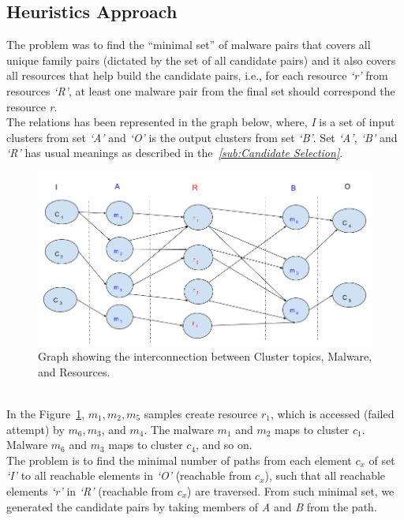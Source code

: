 \subsection{Heuristics Approach}
\label{sub:Heuristics Approach}
The problem was to find the ``minimal set'' of malware pairs that covers all unique family pairs (dictated by the set of all candidate pairs) and it also covers all resources that help build the candidate pairs, i.e., for each resource \emph{`r'} from resources \emph{`R'}, at least one malware pair from the final set should correspond the resource \emph{r}.\\
The relations has been represented in the graph below, where, \emph{I} is a set of input clusters from set \emph{`A'} and \emph{`O'} is the output clusters from set \emph{`B'}. Set \emph{`A', `B'} and \emph{`R'} has usual meanings as described in the\textit{~\autoref{sub:Candidate Selection}}.
\begin{figure}[htbp]
  \centering
  \includegraphics[scale=0.45]{figures/dhkheuristics.png}
  \caption[]{Graph showing the interconnection between Cluster topics, Malware, and Resources.}\label{fig:dhkheuristics}
\end{figure}
\\
In the Figure~\ref{fig:dhkheuristics},  $m_1,m_2, m_5$ samples create resource $r_1$, which is accessed (failed attempt) by $m_6, m_3$, and $m_4$.
The malware $m_1$ and $m_2$ maps to cluster $c_1$. Malware $m_6$ and $m_3$ maps to cluster $c_4$, and so on.
\\
The problem is to find the minimal number of paths from each element \emph{$c_x$} of set \emph{`I'} to all reachable elements in \emph{`O'} (reachable from \emph{$c_x$}), such that all reachable elements \emph{`r'} in \emph{`R'} (reachable from \emph{$c_x$}) are traversed. From such minimal set, we generated the candidate pairs by taking members of \emph{A} and \emph{B} from the path.

